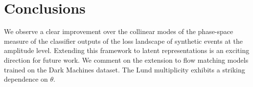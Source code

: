 \section{Conclusions}\label{sec:conclusions}

We observe a clear improvement over the collinear modes of the
phase-space measure of the classifier outputs of the loss landscape of
synthetic events at the amplitude level. Extending this framework to
latent representations is an exciting direction for future work. We
comment on the extension to flow matching models trained on the Dark
Machines dataset. The Lund multiplicity exhibits a striking dependence
on $\theta$.

